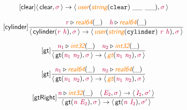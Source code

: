 \documentclass[10pt,leqno,fleqn]{article}
\newcommand{\artVariable}[1]{\mbox{\color{purple}\em #1\/}}
\newcommand{\artConstructor}[1]{\mbox{\sf #1}}
\newcommand{\artCaseInsensitiveLiteral}[1]{\mbox{\tt #1}}
\newcommand{\artSpecial}[1]{\mbox{\color{orange}\sf\em #1}}
\begin{document}
\begin{equation}
\tag*{[\artConstructor{\sf clear}]}
\begin{split}\langle\, \artConstructor{\sf clear}, \artVariable{$\sigma$}\,\rangle \rightarrow \langle\, \artSpecial{user}(\artSpecial{string}(\artCaseInsensitiveLiteral{clear})\ \_\_\ \_\_), \artVariable{$\sigma$}\,\rangle 
\end{split}
\end{equation}

\begin{equation}
\tag*{[\artConstructor{\sf cylinder}]}
\begin{split}\frac{ \artVariable{r}\triangleright \artSpecial{real64}(\_) \quad  \artVariable{h}\triangleright \artSpecial{real64}(\_) }{\langle\, \artConstructor{\sf cylinder}(\artVariable{r}\ \artVariable{h}), \artVariable{$\sigma$}\,\rangle \rightarrow \langle\, \artSpecial{user}(\artSpecial{string}(\artCaseInsensitiveLiteral{cylinder})\ \artVariable{r}\ \artVariable{h}), \artVariable{$\sigma$}\,\rangle }
\end{split}
\end{equation}

\begin{equation}
\tag*{[\artConstructor{\sf gt}]}
\begin{split}\frac{ \artVariable{n$_{1}$}\triangleright \artSpecial{int32}(\_) \quad  \artVariable{n$_{2}$}\triangleright \artSpecial{int32}(\_) }{\langle\, \artConstructor{\sf gt}(\artVariable{n$_{1}$}\ \artVariable{n$_{2}$}), \artVariable{$\sigma$}\,\rangle \rightarrow \langle\, \artSpecial{gt}(\artVariable{n$_{1}$}\ \artVariable{n$_{2}$}), \artVariable{$\sigma$}\,\rangle }
\end{split}
\end{equation}

\begin{equation}
\tag*{[\artConstructor{\sf gt}]}
\begin{split}\frac{ \artVariable{n$_{1}$}\triangleright \artSpecial{real64}(\_) \quad  \artVariable{n$_{2}$}\triangleright \artSpecial{real64}(\_) }{\langle\, \artConstructor{\sf gt}(\artVariable{n$_{1}$}\ \artVariable{n$_{2}$}), \artVariable{$\sigma$}\,\rangle \rightarrow \langle\, \artSpecial{gt}(\artVariable{n$_{1}$}\ \artVariable{n$_{2}$}), \artVariable{$\sigma$}\,\rangle }
\end{split}
\end{equation}

\begin{equation}
\tag*{[\artConstructor{\sf gtRight}]}
\begin{split}\frac{ \artVariable{n}\triangleright \artSpecial{int32}(\_) \quad \langle\, \artVariable{E$_{2}$}, \artVariable{$\sigma$}\,\rangle \rightarrow \langle\, \artVariable{I$_{2}$}, \artVariable{$\sigma$\/$^\prime$}\,\rangle }{\langle\, \artConstructor{\sf gt}(\artVariable{n}\ \artVariable{E$_{2}$}), \artVariable{$\sigma$}\,\rangle \rightarrow \langle\, \artConstructor{\sf gt}(\artVariable{n}\ \artVariable{I$_{2}$}), \artVariable{$\sigma$\/$^\prime$}\,\rangle }
\end{split}
\end{equation}
\end{document}

